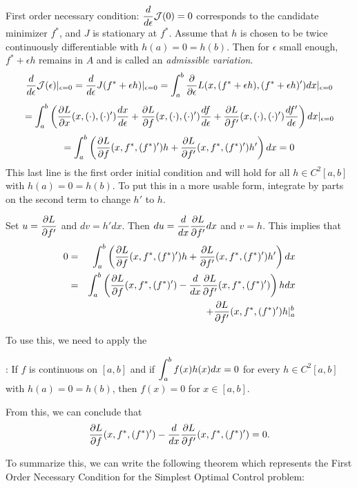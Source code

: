  First order necessary condition:  $\displaystyle \frac{d}{d\epsilon}{\cal J}(0) = 0$ corresponds to the candidate minimizer $f^*$, and $J$ is stationary at $f^*$.   Assume that $h$ is chosen to be twice continuously differentiable with $h(a) = 0 = h(b)$. Then for $\epsilon$ small enough, $f^* + \epsilon h$ remains in $A$ and is called an {\it admissible variation}.
$$ \frac{d}{d\epsilon}{\cal J}(\epsilon)\vert_{\epsilon=0} = \frac{d}{d\epsilon}J(f^* + \epsilon h)\vert_{\epsilon=0}  = \int_a^b \frac{\partial}{\partial\epsilon}L(x, (f^*+\epsilon h), ( f^*+\epsilon h)') dx\vert_{\epsilon=0} $$ 
$$  = \int_a^b \left(\frac{\partial L}{\partial x}(x, (\cdot), (\cdot)')\frac{dx}{d\epsilon} + \frac{\partial L}{\partial f}(x, (\cdot), ( \cdot)')\frac{df}{d\epsilon} + \frac{\partial L}{\partial f'}(x, (\cdot), (\cdot)')\frac{df'}{d\epsilon}\right)dx\vert_{\epsilon=0}$$
$$  = \int_a^b \left( \frac{\partial L}{\partial f}(x, f^*, (f^*)')h + \frac{\partial L}{\partial f'}(x, f^*, (f^*)')h'\right)dx = 0$$
This last line is the first order initial condition and will hold for all $h\in C^2[a,b]$ with $h(a) = 0 = h(b)$.
To put this in a more usable form, integrate by parts on the second term to change $h'$ to $h$.
\vspace{.25in}

Set $\displaystyle u =  \frac{\partial L}{\partial f'}$ and $dv = h'dx.$  Then $\displaystyle du = \frac{d}{dx} \frac{\partial L}{\partial f'} dx$ and $v = h$. This implies that 
\begin{eqnarray}
 0 &=& \int_a^b \left( \frac{\partial L}{\partial f}(x, f^*, (f^*)')h + \frac{\partial L}{\partial f'}(x, f^*, (f^*)')h'\right)dx \nonumber\\
 &=& 
\int_a^b \left( \frac{\partial L}{\partial f}(x, f^*, (f^*)') - \frac{d}{dx}\frac{\partial L}{\partial f'}(x, f^*, (f^*)')\right)hdx \label{eq:keyeqn}
\\&&+\frac{\partial L}{\partial f'}(x, f^*, (f^*)')h\vert_{a}^{b} \nonumber
\end{eqnarray}

\noindent To use this, we need to apply the

: If $f$ is continuous on $[a,b]$ and if $\displaystyle \int_a^b f(x) h(x) dx = 0$ for every $h \in C^2[a,b]$ with $h(a) = 0 = h(b)$, then $f(x) = 0$ for $x\in[a,b]$.

\medskip
\noindent From this, we can conclude that $$\frac{\partial L}{\partial f}(x, f^*, (f^*)') - \frac{d}{dx}\frac{\partial L}{\partial f'}(x, f^*, (f^*)')= 0. $$

To summarize this, we can write the following theorem which represents the First Order Necessary Condition for the Simplest Optimal Control problem:

